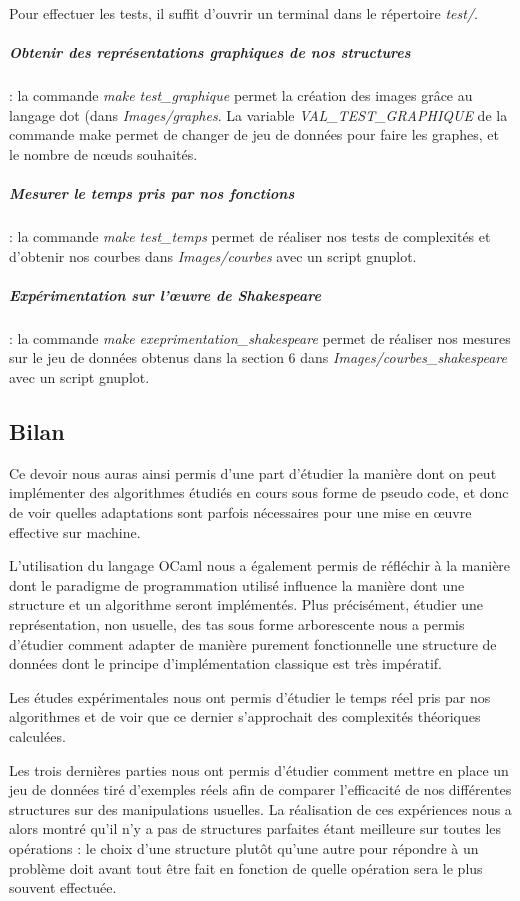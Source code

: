\documentclass[12pt,a4paper]{article}
\begin{document}
Pour effectuer les tests, il suffit d'ouvrir un terminal dans le répertoire \textit{test/}.

\subparagraph{Obtenir des représentations graphiques de nos structures} : la commande \textit{make test\_graphique} permet la création des images grâce au langage dot (dans \textit{Images/graphes}. La variable {\scriptsize\textit{VAL\_TEST\_GRAPHIQUE}} de la commande make permet de changer de jeu de données pour faire les graphes, et le nombre de nœuds souhaités.

\subparagraph{Mesurer le temps pris par nos fonctions} : la commande \textit{make test\_temps} permet de réaliser nos tests de complexités et d'obtenir nos courbes dans \textit{Images/courbes} avec un script gnuplot.

\subparagraph{Expérimentation sur l'œuvre de Shakespeare} : la commande \textit{make exeprimentation\_shakespeare} permet de réaliser nos mesures sur le jeu de données obtenus dans la section 6 dans \textit{Images/courbes\_shakespeare} avec un script gnuplot.


\subsection{Bilan}

Ce devoir nous auras ainsi permis d'une part d'étudier la manière dont on peut implémenter des algorithmes étudiés en cours sous forme de pseudo code, et donc de voir quelles adaptations sont parfois nécessaires pour une mise en œuvre effective sur machine.

L'utilisation du langage OCaml nous a également permis de réfléchir à la manière dont le paradigme de programmation utilisé influence la manière dont une structure et un algorithme seront implémentés.  Plus précisément, étudier une représentation, non usuelle, des tas sous forme arborescente nous a permis d'étudier comment adapter de manière purement fonctionnelle une structure de données dont le principe d'implémentation classique est très impératif.

Les études expérimentales nous ont permis d'étudier le temps réel pris par nos algorithmes et de voir que ce dernier s'approchait des complexités théoriques calculées.

Les trois dernières parties nous ont permis d'étudier comment mettre en place un jeu de données tiré d'exemples réels afin de comparer l'efficacité de nos différentes structures sur des manipulations usuelles. La réalisation de ces expériences nous a alors montré qu'il n'y a pas de structures parfaites étant meilleure sur toutes les opérations : le choix d'une structure plutôt qu'une autre pour répondre à un problème doit avant tout être fait en fonction de quelle opération sera le plus souvent effectuée. 


\cleardoublepage



\end{document}
